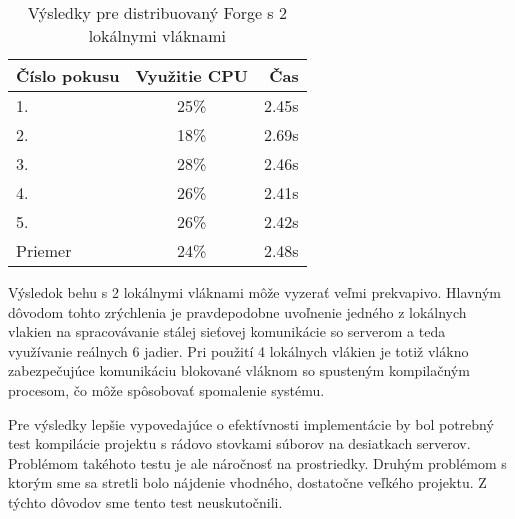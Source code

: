\begin{table}[H]
  \centering
  \begin{tabular}{| l || c | r |}
    \hline
    \v{C}\'{i}slo pokusu & Vyu\v{z}itie CPU & \v{C}as \\ \hline \hline
    1. & 25\% & 2.45s \\ \hline
    2. & 18\% & 2.69s \\ \hline
    3. & 28\% & 2.46s \\ \hline
    4. & 26\% & 2.41s \\ \hline
    5. & 26\% & 2.42s \\ \hline \hline
    Priemer & 24\% & 2.48s \\
    \hline
  \end{tabular}
  \caption{V\'{y}sledky pre distribuovan\'{y} Forge s 2 lok\'{a}lnymi vl\'{a}knami}
  \label{tbl:forge2}
\end{table}

Výsledok behu s 2 lokálnymi vláknami môže vyzerať veľmi prekvapivo. Hlavným dôvodom
tohto zrýchlenia je pravdepodobne uvoľnenie jedného z lokálnych vlakien na spracovávanie
stálej sieťovej komunikácie so serverom a teda využívanie reálnych 6 jadier. Pri použití
4 lokálnych vlákien je totiž vlákno zabezpečujúce komunikáciu blokované vláknom so spusteným
kompilačným procesom, čo môže spôsobovať spomalenie systému.

Pre výsledky lepšie vypovedajúce o efektívnosti implementácie by bol potrebný test
kompilácie projektu s rádovo stovkami súborov na desiatkach serverov. Problémom takéhoto
testu je ale náročnosť na prostriedky. Druhým problémom s ktorým sme sa stretli bolo
nájdenie vhodného, dostatočne veľkého projektu. Z týchto dôvodov sme tento test neuskutočnili.
